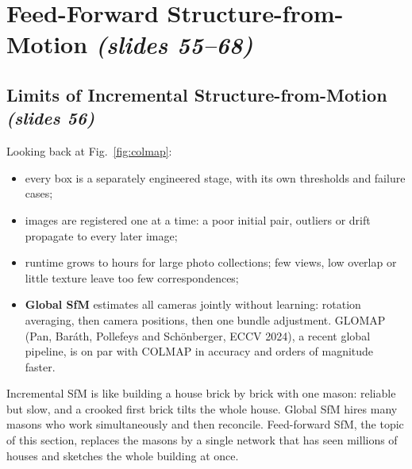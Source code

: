 \documentclass[11pt,a4paper]{article}
\newcommand{\slr}[1]{\texorpdfstring{\emph{(slides #1)}}{(slides #1)}}
\theoremstyle{definition}
\theoremstyle{plain}
\theoremstyle{remark}
\begin{document}
\section{Feed-Forward Structure-from-Motion \slr{55--68}}

\subsection{Limits of Incremental Structure-from-Motion \slr{56}}
Looking back at Fig.~\ref{fig:colmap}:
\begin{itemize}
\item every box is a separately engineered stage, with its own thresholds and failure cases;
\item images are registered one at a time: a poor initial pair, outliers or drift propagate to every later image;
\item runtime grows to hours for large photo collections; few views, low overlap or little texture leave too few correspondences;
\item \textbf{Global SfM} estimates all cameras jointly without learning: rotation averaging, then camera positions, then one bundle adjustment. GLOMAP (Pan, Bar\'ath, Pollefeys and Sch\"onberger, ECCV 2024), a recent global pipeline, is on par with COLMAP in accuracy and orders of magnitude faster.
\end{itemize}

\begin{intuition}
Incremental SfM is like building a house brick by brick with one mason: reliable but slow, and a crooked first brick tilts the whole house. Global SfM hires many masons who work simultaneously and then reconcile. Feed-forward SfM, the topic of this section, replaces the masons by a single network that has seen millions of houses and sketches the whole building at once.
\end{intuition}
\end{document}
